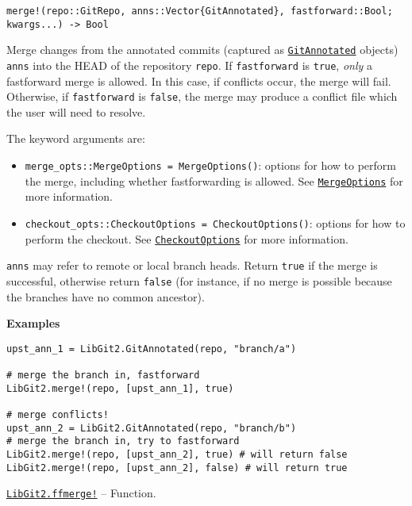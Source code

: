 \begin{adjustwidth}{2em}{0pt}


\begin{verbatim}
merge!(repo::GitRepo, anns::Vector{GitAnnotated}, fastforward::Bool; kwargs...) -> Bool
\end{verbatim}

Merge changes from the annotated commits (captured as \hyperlink{9263689983564368210}{\texttt{GitAnnotated}} objects) \texttt{anns} into the HEAD of the repository \texttt{repo}. If \texttt{fastforward} is \texttt{true}, \emph{only} a fastforward merge is allowed. In this case, if conflicts occur, the merge will fail. Otherwise, if \texttt{fastforward} is \texttt{false}, the merge may produce a conflict file which the user will need to resolve.

The keyword arguments are:

\begin{itemize}
\item \texttt{merge\_opts::MergeOptions = MergeOptions()}: options for how to perform the merge, including whether fastforwarding is allowed. See \hyperlink{7663922722360889557}{\texttt{MergeOptions}} for more information.


\item \texttt{checkout\_opts::CheckoutOptions = CheckoutOptions()}: options for how to perform the checkout. See \hyperlink{16441061243067746546}{\texttt{CheckoutOptions}} for more information.

\end{itemize}
\texttt{anns} may refer to remote or local branch heads. Return \texttt{true} if the merge is successful, otherwise return \texttt{false} (for instance, if no merge is possible because the branches have no common ancestor).

\textbf{Examples}


\begin{verbatim}
upst_ann_1 = LibGit2.GitAnnotated(repo, "branch/a")

# merge the branch in, fastforward
LibGit2.merge!(repo, [upst_ann_1], true)

# merge conflicts!
upst_ann_2 = LibGit2.GitAnnotated(repo, "branch/b")
# merge the branch in, try to fastforward
LibGit2.merge!(repo, [upst_ann_2], true) # will return false
LibGit2.merge!(repo, [upst_ann_2], false) # will return true
\end{verbatim}



\end{adjustwidth}
\hypertarget{12324560892659859842}{} 
\hyperlink{12324560892659859842}{\texttt{LibGit2.ffmerge!}}  -- {Function.}

